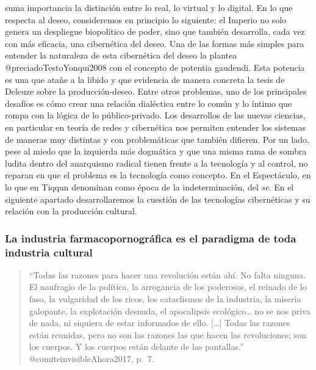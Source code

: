 \documentclass[
]{article}
\begin{document}
suma importancia la distinción entre lo real, lo virtual y lo digital.
En lo que respecta al deseo, consideremos en principio lo siguiente: el
Imperio no solo genera un despliegue biopolítico de poder, sino que
también desarrolla, cada vez con más eficacia, una cibernética del
deseo. Una de las formas más simples para entender la naturaleza de esta
cibernética del deseo la plantea @preciadoTestoYonqui2008 con el
concepto de potentia gaudendi. Esta potencia es una que atañe a la
libido y que evidencia de manera concreta la tesis de Deleuze sobre la
producción-deseo. Entre otros problemas, uno de los principales desafíos
es cómo crear una relación dialéctica entre lo común y lo íntimo que
rompa con la lógica de lo público-privado. Los desarrollos de las nuevas
ciencias, en particular en teoría de redes y cibernética nos permiten
entender los sistemas de maneras muy distintas y con problemáticas que
también difieren. Por un lado, pese al miedo que la izquierda más
dogmática y que una misma rama de sombra ludita dentro del anarquismo
radical tienen frente a la tecnología y al control, no reparan en que el
problema es la tecnología como concepto. En el Espectáculo, en lo que en
Tiqqun denominan como época de la indeterminación, del \emph{se}. En el
siguiente apartado desarrollaremos la cuestión de las tecnologías
cibernéticas y su relación con la producción cultural.

\hypertarget{la-industria-farmacopornogruxe1fica-es-el-paradigma-de-toda-industria-cultural}{%
\subsubsection{La industria farmacopornográfica es el paradigma de toda
industria
cultural}\label{la-industria-farmacopornogruxe1fica-es-el-paradigma-de-toda-industria-cultural}}

\begin{quote}
``Todas las razones para hacer una revolución están ahí. No falta
ninguna. El naufragio de la política, la arrogancia de los poderosos, el
reinado de lo faso, la vulgaridad de los ricos, los cataclismos de la
industria, la miseria galopante, la explotación desnuda, el apocalipsis
ecológico\ldots{} no se nos priva de nada, ni siquiera de estar
informados de ello. {[}\ldots{]} Todas las razones están reunidas, pero
no son las razones las que hacen las revoluciones; son los cuerpos. Y
los cuerpos están delante de las pantallas.'' @comiteinvisibleAhora2017,
p.~7.
\end{quote}
\end{document}
